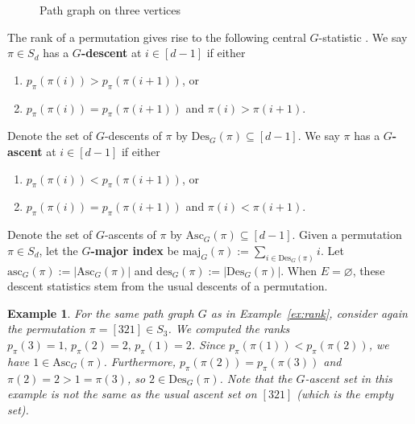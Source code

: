 \documentclass[11pt]{amsart}
\newtheorem{exam}{Example}
\newenvironment{example}{\begin{exam}\sf}{\end{exam}}
\newcommand{\vertex}{\node[vertex]}
\newcommand\Def[1]{{\bf #1}}
\newcommand{\rk}[1][\pi]{p_{#1}}
\newcommand{\maj}{\mathrm{maj}}
\newcommand{\des}{\mathrm{Des}}
\newcommand{\asc}{\mathrm{Asc}}
\newcommand{\desnum}{\mathrm{des}}
\newcommand{\ascnum}{\mathrm{asc}}
\begin{document}
\begin{figure}
    \centering
{}
    \caption{Path graph on three vertices}
    \label{fig:rankgraphexample}
\end{figure}

The rank of a permutation gives rise to the following central $G$-statistic \cite{chunggrahamcoverpol}. 
We say $\pi \in S_d$ has a \Def{$G$-descent} at $i \in [d-1]$ if either
\begin{enumerate}
    \item $\rk(\pi(i)) > \rk(\pi(i+1))$, or 
    \item $\rk(\pi(i)) = \rk(\pi(i+1))$ and $\pi(i) > \pi(i+1)$.
\end{enumerate}
Denote the set of $G$-descents of $\pi$ by $\des_G(\pi) \subseteq [d-1]$. We say $\pi$ has a \Def{$G$-ascent} at $i \in [d-1]$ if either
\begin{enumerate}
    \item $\rk(\pi(i)) < \rk(\pi(i+1))$, or 
    \item $\rk(\pi(i)) = \rk(\pi(i+1))$ and $\pi(i) < \pi(i+1)$.
\end{enumerate}
Denote the set of $G$-ascents of $\pi$ by $\asc_G(\pi) \subseteq [d-1]$. 
Given a permutation $\pi \in S_d$, let the \Def{$G$-major index} be $\maj_G(\pi) := \sum_{i \in \des_G(\pi)} i$. 
Let $\ascnum_G(\pi) := |\asc_G(\pi)|$ and $\desnum_G(\pi):= |\des_G(\pi)|$.
When $E = \varnothing$, these descent statistics stem from the usual descents of a permutation.

\begin{example}
    For the same path graph $G$ as in Example~\ref{ex:rank}, consider again the permutation $\pi = [321] \in S_3$. 
    We computed the ranks $\rk(3)=1, \, \rk(2)=2, \, \rk(1)=2$. 
    Since $\rk(\pi(1)) < \rk(\pi(2))$, we have $1 \in \asc_G(\pi)$. 
    Furthermore, $\rk(\pi(2))=\rk(\pi(3))$ and $\pi(2)=2 > 1 = \pi(3)$, so $2 \in \des_G(\pi)$. 
    Note that the $G$-ascent set in this example is not the same as the usual ascent set on $[321]$ (which is
the empty set).
\end{example}
\end{document}
